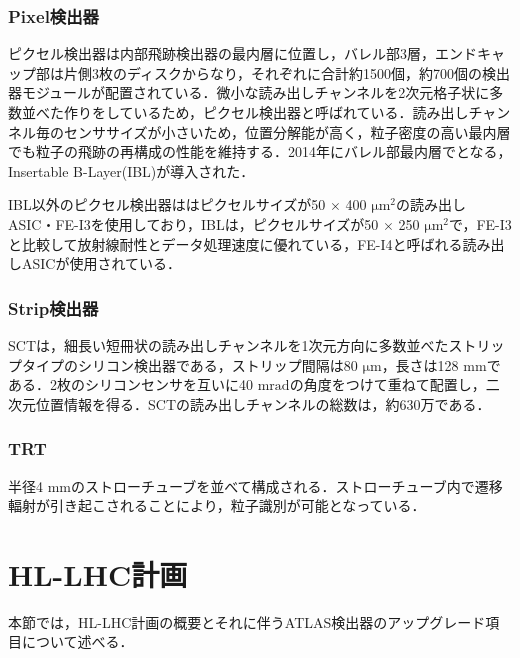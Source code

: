 \subsubsection*{Pixel検出器}
ピクセル検出器は内部飛跡検出器の最内層に位置し，バレル部3層，エンドキャップ部は片側3枚のディスクからなり，それぞれに合計約1500個，約700個の検出器モジュールが配置されている．微小な読み出しチャンネルを2次元格子状に多数並べた作りをしているため，ピクセル検出器と呼ばれている．読み出しチャンネル毎のセンササイズが小さいため，位置分解能が高く，粒子密度の高い最内層でも粒子の飛跡の再構成の性能を維持する．2014年にバレル部最内層でとなる，Insertable B-Layer(IBL)が導入された．\par
IBL以外のピクセル検出器ははピクセルサイズが50 $\times$ 400 $\mathrm{\mu m^2}$の読み出しASIC・FE-I3を使用しており，IBLは，ピクセルサイズが50 $\times$ 250 $\mathrm{\mu m^2}$で，FE-I3と比較して放射線耐性とデータ処理速度に優れている，FE-I4と呼ばれる読み出しASICが使用されている．\par

\subsubsection*{Strip検出器}
SCTは，細長い短冊状の読み出しチャンネルを1次元方向に多数並べたストリップタイプのシリコン検出器である，ストリップ間隔は80 $\mathrm{\mu m}$，長さは128 $\mathrm{mm}$である．2枚のシリコンセンサを互いに40 $\mathrm{mrad}$の角度をつけて重ねて配置し，二次元位置情報を得る．SCTの読み出しチャンネルの総数は，約630万である．

\subsubsection*{TRT}
半径4 $\mathrm{mm}$のストローチューブを並べて構成される．ストローチューブ内で遷移輻射が引き起こされることにより，粒子識別が可能となっている．

\section{HL-LHC計画}
\label{sec:HL-LHC}
本節では，HL-LHC計画の概要とそれに伴うATLAS検出器のアップグレード項目について述べる．\par

